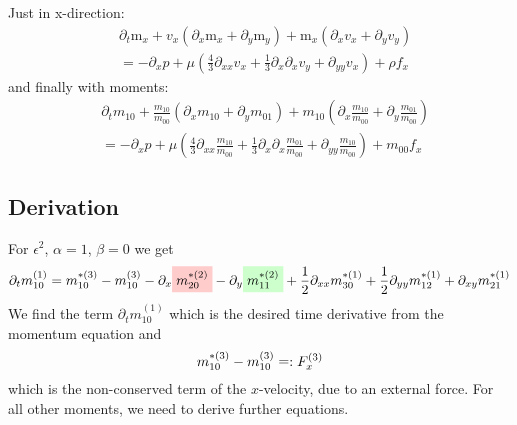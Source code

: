 \documentclass{article}
\begin{document}
Just in x-direction:
\begin{equation}
  \begin{aligned}
    & \partial_t \text{m}_x
    + v_x (\partial_x \text{m}_x + \partial_y \text{m}_y)
    + \text{m}_x (\partial_x v_x + \partial_y v_y)  \\
    & =
     - \partial_x p
     + \mu \left(\frac{4}{3}\partial_{xx}v_x
            + \frac{1}{3}\partial_x\partial_x v_y
            + \partial_{yy} v_x \right)  + \rho f_x
  \end{aligned}
\end{equation}
and finally with moments:
\begin{equation}
  \begin{aligned}
    & \partial_t m_{10}
    + \frac{m_{10}}{m_{00}} (\partial_x m_{10} + \partial_y m_{01})
    + m_{10} (\partial_x \frac{m_{10}}{m_{00}} + \partial_y \frac{m_{01}}{m_{00}})  \\
    & =
     - \partial_x p
     + \mu \left(\frac{4}{3}\partial_{xx}\frac{m_{10}}{m_{00}}
            + \frac{1}{3}\partial_x\partial_x \frac{m_{01}}{m_{00}}
            + \partial_{yy} \frac{m_{10}}{m_{00}} \right) + m_{00}f_x
  \end{aligned}
\end{equation}

\subsection{Derivation}
\label{sub:Derivation of momentum equation}

For $\epsilon^2$, $\alpha=1$, $\beta=0$ we get
\begin{equation}
  \label{eq: start of momentum equation derivation}
  \begin{aligned}
     \partial_t m_{10}^{(1)} =
    m_{10}^{*(3)} - m_{10}^{(3)}
    - \partial_x \highlight{m_{20}^{*(2)}} -
    \partial_y \highlight[green]{m_{11}^{*(2)}} + \frac{1}{2}\partial_{xx} m_{30}^{*(1)} + \frac{1}{2} \partial_{yy} m_{12}^{*(1)} + \partial_{xy} m_{21}^{*(1)}
  \end{aligned}
\end{equation}
We find the term $\partial_t m_{10}^{(1)} $ which is the desired time derivative from the momentum equation and
\begin{equation}
  m_{10}^{*(3)} - m_{10}^{(3)}\mathrel{\mathop=}: F_x^{(3)}
\end{equation}
 which is the non-conserved term of the $x$-velocity, due to an external force. For all other moments, we need to derive further equations.
\end{document}
